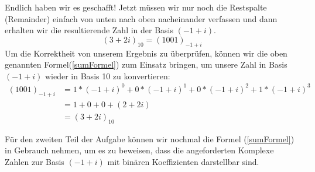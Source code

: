 \documentclass[course=erap]{aspdoc}
\begin{document}
    Endlich haben wir es geschafft!
    Jetzt müssen wir nur noch die Restspalte (Remainder) einfach von unten nach oben nacheinander verfassen und dann erhalten wir die resultierende Zahl in der Basis $(-1+i)$.
    \[(3 + 2i)_{10} = (1001)_{-1+i}\]
    \newline
    Um die Korrektheit von unserem Ergebnis zu überprüfen, können wir die oben genannten Formel(\ref{sumFormel}) zum Einsatz bringen, um unsere Zahl in Basis $(-1+i)$ wieder in Basis 10 zu konvertieren:
    \begin{equation*}
        \begin{split}
        (1001)
            _{-1+i} &= 1*(-1+i)^0 + 0*(-1+i)^1 + 0*(-1+i)^2 +1*(-1+i)^3 \\
            &=1 + 0 + 0 + (2 + 2i) \\
            &= (3+2i)_{10}
        \end{split}
    \end{equation*}

    Für den zweiten Teil der Aufgabe können wir nochmal die Formel (\ref{sumFormel}) in Gebrauch nehmen, um es zu beweisen, dass die angeforderten Komplexe Zahlen zur Basis $(-1+i)$ mit binären Koeffizienten darstellbar sind.
\end{document}
